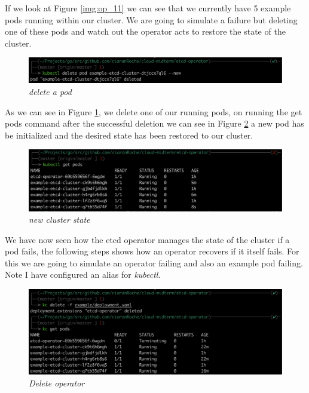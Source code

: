 If we look at Figure \ref{img:op_11} we can see that we currently have 5 example pods running within our cluster. We are going to simulate a failure but deleting one of these pods and watch out the operator acts to restore the state of the cluster. 
\begin{figure}[!ht]
\centering
\includegraphics*[width=1\textwidth]{images/op912.png}
\caption{\em delete a pod}
\label{img:op_12}
\end{figure}

As we can see in Figure \ref{img:op_12}, we delete one of our running pods, on running the get pods command after the successful deletion we can see in Figure \ref{img:op_13} a new pod has be initialized and the desired state has been restored to our cluster.
\begin{figure}[!ht]
\centering
\includegraphics*[width=1\textwidth]{images/op913.png}
\caption{\em new cluster state}
\label{img:op_13}
\end{figure}

We have now seen how the etcd operator manages the state of the cluster if a pod fails, the following steps shows how an operator recovers if it itself fails. For this we are going to simulate an operator failing and also an example pod failing. Note I have configured an alias for \textit{kubectl}.
\begin{figure}[!ht]
\centering
\includegraphics*[width=1\textwidth]{images/op914.png}
\caption{\em Delete operator}
\label{img:op_14}
\end{figure}

